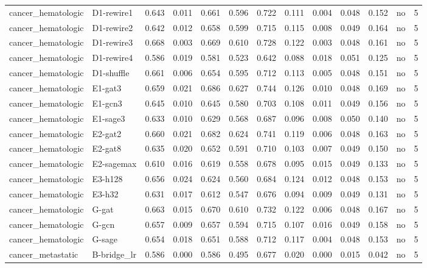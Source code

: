 \begin{table}[t]
\begin{tabular}{lllllllllllll}
cancer\_hematologic & D1-rewire1 & 0.643 & 0.011 & 0.661 & 0.596 & 0.722 & 0.111 & 0.004 & 0.048 & 0.152 & no & 5 \\
cancer\_hematologic & D1-rewire2 & 0.642 & 0.012 & 0.658 & 0.599 & 0.715 & 0.115 & 0.008 & 0.049 & 0.164 & no & 5 \\
cancer\_hematologic & D1-rewire3 & 0.668 & 0.003 & 0.669 & 0.610 & 0.728 & 0.122 & 0.003 & 0.048 & 0.161 & no & 5 \\
cancer\_hematologic & D1-rewire4 & 0.586 & 0.019 & 0.581 & 0.523 & 0.642 & 0.088 & 0.018 & 0.051 & 0.125 & no & 5 \\
cancer\_hematologic & D1-shuffle & 0.661 & 0.006 & 0.654 & 0.595 & 0.712 & 0.113 & 0.005 & 0.048 & 0.151 & no & 5 \\
cancer\_hematologic & E1-gat3 & 0.659 & 0.021 & 0.686 & 0.627 & 0.744 & 0.126 & 0.010 & 0.048 & 0.169 & no & 5 \\
cancer\_hematologic & E1-gcn3 & 0.645 & 0.010 & 0.645 & 0.580 & 0.703 & 0.108 & 0.011 & 0.049 & 0.156 & no & 5 \\
cancer\_hematologic & E1-sage3 & 0.633 & 0.010 & 0.629 & 0.568 & 0.687 & 0.096 & 0.008 & 0.050 & 0.140 & no & 5 \\
cancer\_hematologic & E2-gat2 & 0.660 & 0.021 & 0.682 & 0.624 & 0.741 & 0.119 & 0.006 & 0.048 & 0.163 & no & 5 \\
cancer\_hematologic & E2-gat8 & 0.635 & 0.020 & 0.652 & 0.591 & 0.710 & 0.103 & 0.007 & 0.049 & 0.150 & no & 5 \\
cancer\_hematologic & E2-sagemax & 0.610 & 0.016 & 0.619 & 0.558 & 0.678 & 0.095 & 0.015 & 0.049 & 0.133 & no & 5 \\
cancer\_hematologic & E3-h128 & 0.656 & 0.024 & 0.624 & 0.560 & 0.684 & 0.124 & 0.012 & 0.048 & 0.153 & no & 5 \\
cancer\_hematologic & E3-h32 & 0.631 & 0.017 & 0.612 & 0.547 & 0.676 & 0.094 & 0.009 & 0.049 & 0.131 & no & 5 \\
cancer\_hematologic & G-gat & 0.663 & 0.015 & 0.670 & 0.610 & 0.732 & 0.122 & 0.006 & 0.048 & 0.167 & no & 5 \\
cancer\_hematologic & G-gcn & 0.657 & 0.009 & 0.657 & 0.594 & 0.715 & 0.107 & 0.016 & 0.049 & 0.158 & no & 5 \\
cancer\_hematologic & G-sage & 0.654 & 0.018 & 0.651 & 0.588 & 0.712 & 0.117 & 0.004 & 0.048 & 0.153 & no & 5 \\
cancer\_metastatic & B-bridge\_lr & 0.586 & 0.000 & 0.586 & 0.495 & 0.677 & 0.020 & 0.000 & 0.015 & 0.042 & no & 5 \\

\end{tabular}
\end{table}
